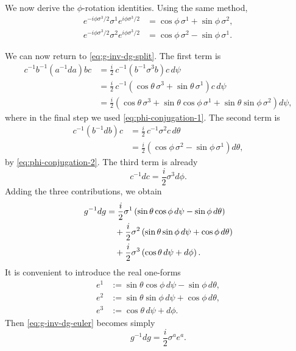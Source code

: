 \medskip

\noindent We now derive the $\phi$-rotation identities. Using the same method,
\begin{align}
e^{-i\phi\sigma^3/2}\sigma^1 e^{i\phi\sigma^3/2}
&= \cos\phi\,\sigma^1 + \sin\phi\,\sigma^2,
\label{eq:phi-conjugation-1}\\
e^{-i\phi\sigma^3/2}\sigma^2 e^{i\phi\sigma^3/2}
&= \cos\phi\,\sigma^2 - \sin\phi\,\sigma^1.
\label{eq:phi-conjugation-2}
\end{align}

\medskip

\noindent We can now return to \eqref{eq:g-inv-dg-split}. The first term is
\begin{align*}
c^{-1}b^{-1}(a^{-1}da)bc
&=
\frac{i}{2}\,c^{-1}\left(b^{-1}\sigma^3 b\right)c\, d\psi \\
&=
\frac{i}{2}\,c^{-1}\left(\cos\theta\,\sigma^3 + \sin\theta\,\sigma^1\right)c\, d\psi \\
&=
\frac{i}{2}\left(\cos\theta\,\sigma^3 + \sin\theta\cos\phi\,\sigma^1 + \sin\theta\sin\phi\,\sigma^2\right)d\psi,
\end{align*}
where in the final step we used \eqref{eq:phi-conjugation-1}. The second term is
\begin{align*}
c^{-1}(b^{-1}db)c
&=
\frac{i}{2}\,c^{-1}\sigma^2 c\, d\theta \\
&=
\frac{i}{2}\left(\cos\phi\,\sigma^2 - \sin\phi\,\sigma^1\right)d\theta,
\end{align*}
by \eqref{eq:phi-conjugation-2}. The third term is already
\begin{equation*}
c^{-1}dc = \frac{i}{2}\sigma^3 d\phi.
\end{equation*}
Adding the three contributions, we obtain
\begin{align}
g^{-1}dg
&=
\frac{i}{2}\sigma^1\left(\sin\theta\cos\phi\,d\psi - \sin\phi\,d\theta\right) \notag\\
&\quad+
\frac{i}{2}\sigma^2\left(\sin\theta\sin\phi\,d\psi + \cos\phi\,d\theta\right) \notag\\
&\quad+
\frac{i}{2}\sigma^3\left(\cos\theta\,d\psi + d\phi\right).
\label{eq:g-inv-dg-euler}
\end{align}
It is convenient to introduce the real one-forms
\begin{align}
e^1 &:= \sin\theta\cos\phi\,d\psi - \sin\phi\,d\theta,
\label{eq:e1-form}\\
e^2 &:= \sin\theta\sin\phi\,d\psi + \cos\phi\,d\theta,
\label{eq:e2-form}\\
e^3 &:= \cos\theta\,d\psi + d\phi.
\label{eq:e3-form}
\end{align}
Then \eqref{eq:g-inv-dg-euler} becomes simply
\begin{equation}\label{eq:g-inv-dg-frame}
g^{-1}dg = \frac{i}{2}\sigma^a e^a.
\end{equation}

